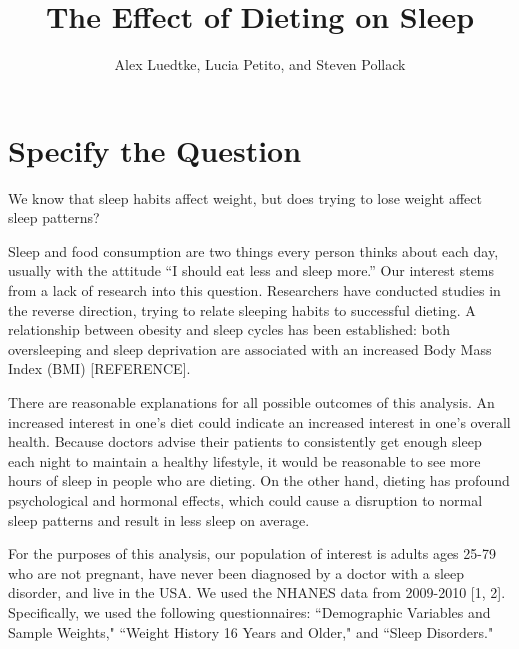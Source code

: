 \documentclass{article}
\begin{document}




\title{\textbf{The Effect of Dieting on Sleep}}
\author{Alex Luedtke, Lucia Petito, and Steven Pollack}
\date{}
\maketitle

\section{Specify the Question}

We know that sleep habits affect weight, but does trying to lose weight affect sleep patterns?

Sleep and food consumption are two things every person thinks about each day, usually with the attitude ``I should eat less and sleep more.''  Our interest stems from a lack of research into this question.  Researchers have conducted studies in the reverse direction, trying to relate sleeping habits to successful dieting.  A relationship between obesity and sleep cycles has been established: both oversleeping and sleep deprivation are associated with an increased Body Mass Index (BMI) [REFERENCE].  

There are reasonable explanations for all possible outcomes of this analysis.  An increased interest in one's diet could indicate an increased interest in one's overall health.  Because doctors advise their patients to consistently get enough sleep each night to maintain a healthy lifestyle, it would be reasonable to see more hours of sleep in people who are dieting.  On the other hand, dieting has profound psychological and hormonal effects, which could cause a disruption to normal sleep patterns and result in less sleep on average.

For the purposes of this analysis, our population of interest is adults ages 25-79 who are not pregnant, have never been diagnosed by a doctor with a sleep disorder, and live in the USA.  We used the NHANES data from 2009-2010 [1, 2].  Specifically, we used the following questionnaires: ``Demographic Variables and Sample Weights," ``Weight History 16 Years and Older," and ``Sleep Disorders."
\end{document}
